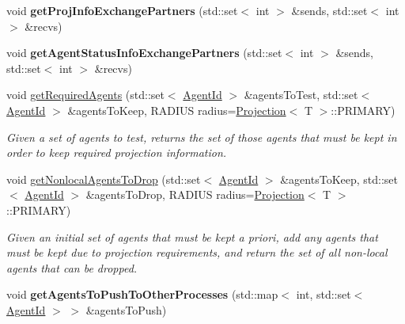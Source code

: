 \begin{DoxyCompactItemize}
\item 
\hypertarget{classrepast_1_1_shared_context_a657f89618ca05e71250cf8e7ef632c8d}{void {\bfseries get\-Proj\-Info\-Exchange\-Partners} (std\-::set$<$ int $>$ \&sends, std\-::set$<$ int $>$ \&recvs)}\label{classrepast_1_1_shared_context_a657f89618ca05e71250cf8e7ef632c8d}

\item 
\hypertarget{classrepast_1_1_shared_context_a825be48354b742b7718c106d954932b4}{void {\bfseries get\-Agent\-Status\-Info\-Exchange\-Partners} (std\-::set$<$ int $>$ \&sends, std\-::set$<$ int $>$ \&recvs)}\label{classrepast_1_1_shared_context_a825be48354b742b7718c106d954932b4}

\item 
\hypertarget{classrepast_1_1_shared_context_ad7acd6256e4daa5efa3133cda76f7e06}{void \hyperlink{classrepast_1_1_shared_context_ad7acd6256e4daa5efa3133cda76f7e06}{get\-Required\-Agents} (std\-::set$<$ \hyperlink{classrepast_1_1_agent_id}{Agent\-Id} $>$ \&agents\-To\-Test, std\-::set$<$ \hyperlink{classrepast_1_1_agent_id}{Agent\-Id} $>$ \&agents\-To\-Keep, R\-A\-D\-I\-U\-S radius=\hyperlink{classrepast_1_1_projection}{Projection}$<$ T $>$\-::P\-R\-I\-M\-A\-R\-Y)}\label{classrepast_1_1_shared_context_ad7acd6256e4daa5efa3133cda76f7e06}

\begin{DoxyCompactList}\small\item\em Given a set of agents to test, returns the set of those agents that must be kept in order to keep required projection information. \end{DoxyCompactList}\item 
\hypertarget{classrepast_1_1_shared_context_a558d18f1606931efc8a9dd6388a263a0}{void \hyperlink{classrepast_1_1_shared_context_a558d18f1606931efc8a9dd6388a263a0}{get\-Nonlocal\-Agents\-To\-Drop} (std\-::set$<$ \hyperlink{classrepast_1_1_agent_id}{Agent\-Id} $>$ \&agents\-To\-Keep, std\-::set$<$ \hyperlink{classrepast_1_1_agent_id}{Agent\-Id} $>$ \&agents\-To\-Drop, R\-A\-D\-I\-U\-S radius=\hyperlink{classrepast_1_1_projection}{Projection}$<$ T $>$\-::P\-R\-I\-M\-A\-R\-Y)}\label{classrepast_1_1_shared_context_a558d18f1606931efc8a9dd6388a263a0}

\begin{DoxyCompactList}\small\item\em Given an initial set of agents that must be kept a priori, add any agents that must be kept due to projection requirements, and return the set of all non-\/local agents that can be dropped. \end{DoxyCompactList}\item 
\hypertarget{classrepast_1_1_shared_context_aa2e8604b3d9aa97c3eedd9f51f225647}{void {\bfseries get\-Agents\-To\-Push\-To\-Other\-Processes} (std\-::map$<$ int, std\-::set$<$ \hyperlink{classrepast_1_1_agent_id}{Agent\-Id} $>$ $>$ \&agents\-To\-Push)}\label{classrepast_1_1_shared_context_aa2e8604b3d9aa97c3eedd9f51f225647}


\end{DoxyCompactItemize}
